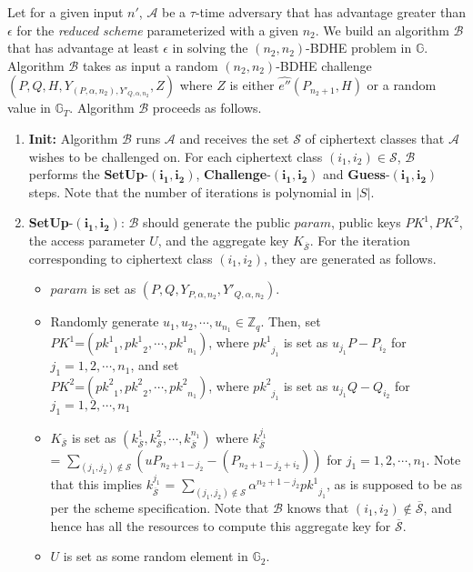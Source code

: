 \textbf{} Let for a given input $n'$, $\mathcal{A}$ be a $\tau$-time adversary that has advantage greater than $\epsilon$ for the \emph{reduced scheme} parameterized with a given $n_2$. We build an algorithm $\mathcal{B}$ that has advantage at least $\epsilon$ in solving the $(n_2,n_2)$-BDHE problem in $\mathbb{G}$. Algorithm $\mathcal{B}$ takes as input a random $(n_2,n_2)$-BDHE challenge $(P,Q,H,Y_{(P,\alpha,n_2),Y'_{Q,\alpha,n_2}},Z)$ where $Z$ is either $\hat{e''}(P_{n_2+1},H)$ or a random value in $\mathbb{G}_T$. Algorithm $\mathcal{B}$ proceeds as follows.

\begin{enumerate}
 \item \textbf{Init:} Algorithm $\mathcal{B}$ runs $\mathcal{A}$ and receives the set $\mathcal{S}$ of ciphertext classes that $\mathcal{A}$ wishes to be challenged on. For each ciphertext class $(i_1,i_2)\in\mathcal{S}$, $\mathcal{B}$ performs the \textbf{SetUp}-$\mathbf{(i_1,i_2)}$, \textbf{Challenge}-$\mathbf{(i_1,i_2)}$ and \textbf{Guess}-$\mathbf{(i_1,i_2)}$ steps. Note that the number of iterations is polynomial in $|S|$. 
 
 \item \textbf{SetUp}-$\mathbf{(i_1,i_2)}$: $\mathcal{B}$ should generate the public $param$, public keys $PK^1,PK^2$, the access parameter $U$, and the aggregate key $K_{\overline{\mathcal{S}}}$. For the iteration corresponding to ciphertext class $(i_1,i_2)$, they are generated as follows.
 \begin{itemize}
  \item $param$ is set as $(P,Q,Y_{P,\alpha,n_2},Y'_{Q,\alpha,n_2})$.
  \item Randomly generate $u_1,u_2,\cdots,u_{n_1} \in \mathbb{Z}_q$. Then, set\\ $PK^1$=$({pk^1}_1,{pk^1}_2,\cdots,{pk^1}_{n_1})$, where ${pk^1}_{j_1}$ is set as $u_{j_1}P - P_{i_2}$ for $j_1=1,2,\cdots,n_1$, and set\\ $PK^2$=$({pk^2}_1,{pk^2}_2,\cdots,{pk^2}_{n_1})$, where ${pk^2}_{j_1}$ is set as $u_{j_1}Q - Q_{i_2}$ for $j_1=1,2,\cdots,n_1$
  \item $K_{\overline{\mathcal{S}}}$ is set as $(k^{1}_{\overline{\mathcal{S}}},k^{2}_{\overline{\mathcal{S}}},\cdots,k^{n_1}_{\overline{\mathcal{S}}})$ where $k^{j_1}_{\overline{\mathcal{S}}}$\\ = $\sum_{(j_1,j_2)\notin\mathcal{S}}({u}P_{n_2+1-j_2}-(P_{n_2+1-j_2+i_2}))$ for $j_1=1,2,\cdots,n_1$. Note that this implies $k^{j_1}_{\overline{\mathcal{S}}}$ = $\sum_{(j_1,j_2)\notin\mathcal{S}}\alpha^{n_2+1-j_2}{pk^{1}}_{j_1}$, as is supposed to be as per the scheme specification. Note that $\mathcal{B}$ knows that $(i_1,i_2)\notin \overline{\mathcal{S}}$, and hence has all the resources to compute this aggregate key for $\overline{\mathcal{S}}$. 
  \item $U$ is set as some random element in $\mathbb{G}_2$.
 \end{itemize}
 

\end{enumerate}
